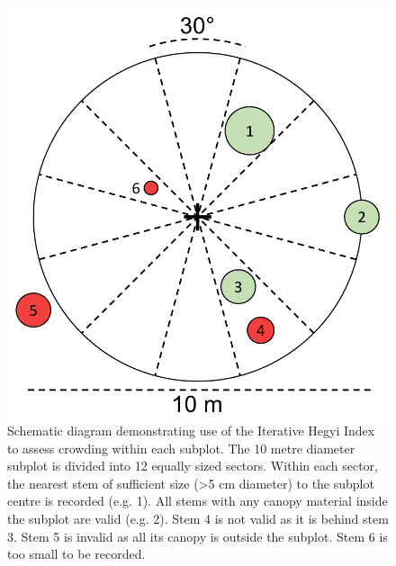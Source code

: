 \documentclass[11pt,a4paper]{article}
\begin{document}
\begin{figure}
	\includegraphics[width=0.6\linewidth]{hegyi}
	\caption{Schematic diagram demonstrating use of the Iterative Hegyi Index to assess crowding within each subplot. The 10 metre diameter subplot is divided into 12 equally sized sectors. Within each sector, the nearest stem of sufficient size (>5 cm diameter) to the subplot centre is recorded (e.g. 1). All stems with any canopy material inside the subplot are valid (e.g. 2). Stem 4 is not valid as it is behind stem 3. Stem 5 is invalid as all its canopy is outside the subplot. Stem 6 is too small to be recorded.}
	\label{hegyi}
\end{figure}

\FloatBarrier{}
\printbibliography
\end{document}
